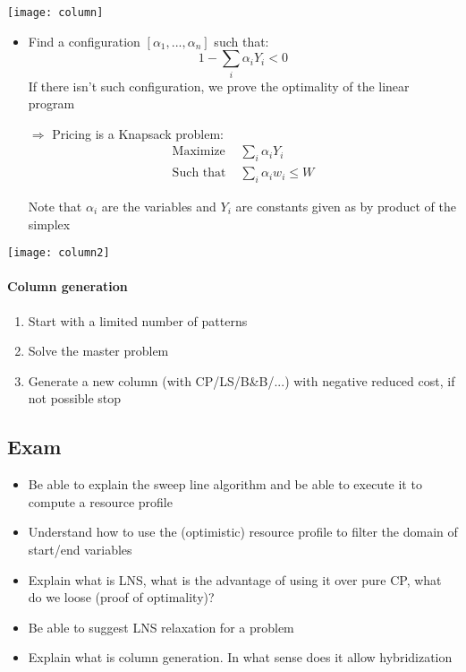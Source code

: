 \begin{center}
\texttt{[image: column]}
\end{center}

\begin{itemize}
    \item Find a configuration $[\alpha_1, ..., \alpha_n]$ such that:
        $$1 - \sum_i \alpha_i Y_i < 0$$
        If there isn't such configuration, we prove the optimality of the
        linear program

    \item[$\Rightarrow$] Pricing is a Knapsack problem:
        \begin{eqnarray*}
            \textrm{Maximize } & \sum_i \alpha_i Y_i\\
            \textrm{Such that } & \sum_i \alpha_i w_i \leq W
        \end{eqnarray*}

        Note that $\alpha_i$ are the variables and $Y_i$ are constants
        given as by product of the simplex
\end{itemize}

\begin{center}
\texttt{[image: column2]}
\end{center}


\paragraph{Column generation}
\begin{enumerate}
    \item Start with a limited number of patterns
    \item Solve the master problem 
    \item  Generate a new column (with CP/LS/B\&B/...) with negative reduced cost, if
        not possible stop
\end{enumerate}


\subsection{Exam}
\begin{itemize}
    \item  Be able to explain the sweep line algorithm and be
        able to execute it to compute a resource profile
    \item  Understand how to use the (optimistic) resource profile
        to filter the domain of start/end variables
    \item  Explain what is LNS, what is the advantage of using it
        over pure CP, what do we loose (proof of optimality)?
    \item  Be able to suggest LNS relaxation for a problem
    \item  Explain what is column generation. In what sense does
        it allow hybridization
\end{itemize}



